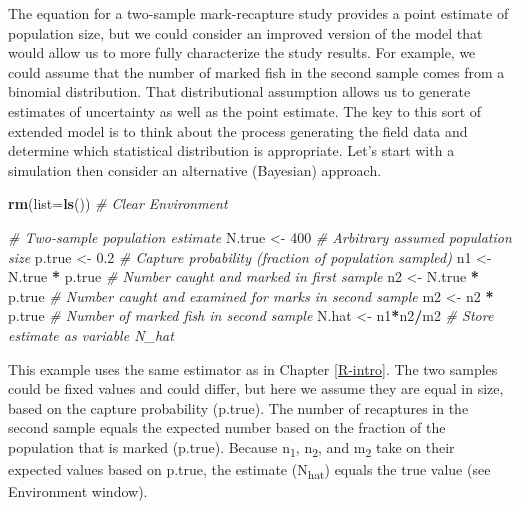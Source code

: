 \documentclass[
]{krantz}
\makeatletter
\newenvironment{Shaded}{\begin{snugshade}}{\end{snugshade}}
\newcommand{\AttributeTok}[1]{\textcolor[rgb]{0.27,0.27,0.27}{#1}}
\newcommand{\CommentTok}[1]{\textcolor[rgb]{0.37,0.37,0.37}{\textit{#1}}}
\newcommand{\DecValTok}[1]{\textcolor[rgb]{0.06,0.06,0.06}{#1}}
\newcommand{\FloatTok}[1]{\textcolor[rgb]{0.06,0.06,0.06}{#1}}
\newcommand{\FunctionTok}[1]{\textcolor[rgb]{0.27,0.27,0.27}{\textbf{#1}}}
\newcommand{\NormalTok}[1]{#1}
\newcommand{\OtherTok}[1]{\textcolor[rgb]{0.37,0.37,0.37}{#1}}
\newcommand{\SpecialCharTok}[1]{\textcolor[rgb]{0.43,0.43,0.43}{\textbf{#1}}}
\newenvironment{kframe}{%
\medskip{}
\setlength{\fboxsep}{.8em}
 \def\at@end@of@kframe{}%
 \ifinner\ifhmode%
  \def\at@end@of@kframe{\end{minipage}}%
  \begin{minipage}{\columnwidth}%
 \fi\fi%
 \def\FrameCommand##1{\hskip\@totalleftmargin \hskip-\fboxsep
 \colorbox{shadecolor}{##1}\hskip-\fboxsep
     \hskip-\linewidth \hskip-\@totalleftmargin \hskip\columnwidth}%
 \MakeFramed {\advance\hsize-\width
   \@totalleftmargin\z@ \linewidth\hsize
   \@setminipage}}%
 {\par\unskip\endMakeFramed%
 \at@end@of@kframe}
\renewenvironment{Shaded}{\begin{kframe}}{\end{kframe}}
\makeatother
\begin{document}
The equation for a two-sample mark-recapture study provides a point estimate of population size, but we could consider an improved version of the model that would allow us to more fully characterize the study results. For example, we could assume that the number of marked fish in the second sample comes from a binomial distribution. That distributional assumption allows us to generate estimates of uncertainty as well as the point estimate. The key to this sort of extended model is to think about the process generating the field data and determine which statistical distribution is appropriate. Let's start with a simulation then consider an alternative (Bayesian) approach.

\begin{Shaded}
\begin{Highlighting}[]
\FunctionTok{rm}\NormalTok{(}\AttributeTok{list=}\FunctionTok{ls}\NormalTok{()) }\CommentTok{\# Clear Environment}

\CommentTok{\# Two{-}sample population estimate}
\NormalTok{N.true }\OtherTok{\textless{}{-}} \DecValTok{400}  \CommentTok{\# Arbitrary assumed population size}
\NormalTok{p.true }\OtherTok{\textless{}{-}} \FloatTok{0.2} \CommentTok{\# Capture probability (fraction of population sampled)}
\NormalTok{n1 }\OtherTok{\textless{}{-}}\NormalTok{ N.true }\SpecialCharTok{*}\NormalTok{ p.true }\CommentTok{\# Number caught and marked in first sample}
\NormalTok{n2 }\OtherTok{\textless{}{-}}\NormalTok{ N.true }\SpecialCharTok{*}\NormalTok{ p.true }\CommentTok{\# Number caught and examined for marks in second sample}
\NormalTok{m2 }\OtherTok{\textless{}{-}}\NormalTok{ n2 }\SpecialCharTok{*}\NormalTok{ p.true }\CommentTok{\# Number of marked fish in second sample}
\NormalTok{N.hat }\OtherTok{\textless{}{-}}\NormalTok{ n1}\SpecialCharTok{*}\NormalTok{n2}\SpecialCharTok{/}\NormalTok{m2 }\CommentTok{\# Store estimate as variable N\_hat}
\end{Highlighting}
\end{Shaded}

This example uses the same estimator as in Chapter \ref{R-intro}. The two samples could be fixed values and could differ, but here we assume they are equal in size, based on the capture probability (p.true). The number of recaptures in the second sample equals the expected number based on the fraction of the population that is marked (p.true). Because n\textsubscript{1}, n\textsubscript{2}, and m\textsubscript{2} take on their expected values based on p.true, the estimate (N\textsubscript{hat}) equals the true value (see Environment window).
\end{document}
